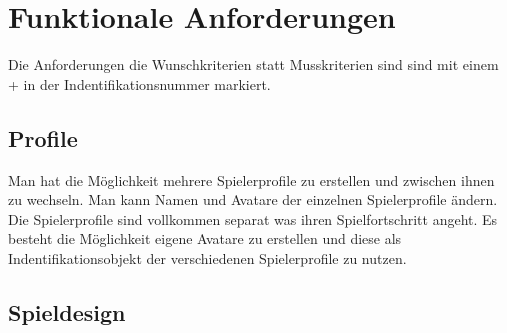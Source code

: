 \section{Funktionale Anforderungen}

Die Anforderungen die Wunschkriterien statt Musskriterien sind sind mit einem + in der Indentifikationsnummer markiert.

\subsection{Profile}

\begin{requirements}
	Man hat die Möglichkeit mehrere Spielerprofile zu erstellen und zwischen ihnen zu wechseln.
	 Man kann Namen und Avatare der einzelnen Spielerprofile ändern.
	Die Spielerprofile sind vollkommen separat was ihren Spielfortschritt angeht. 
	Es besteht die Möglichkeit eigene Avatare zu erstellen und diese als Indentifikationsobjekt der verschiedenen Spielerprofile zu nutzen.
\end{requirements}

\subsection{Spieldesign}

